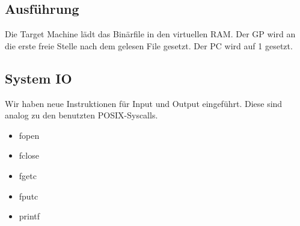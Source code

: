 \documentclass[a4paper]{article}
\begin{document}
	\subsection{Ausführung}
	Die Target Machine lädt das Binärfile in den virtuellen RAM.
	Der GP wird an die erste freie Stelle nach dem gelesen File gesetzt.
	Der PC wird auf 1 gesetzt.

	\subsection{System IO}
	Wir haben neue Instruktionen für Input und Output eingeführt.
	Diese sind analog zu den benutzten POSIX-Syscalls.
	\begin{itemize}
		\item fopen
		\item fclose
		\item fgetc
		\item fputc
		\item printf
	\end{itemize}

	\newpage
\end{document}
